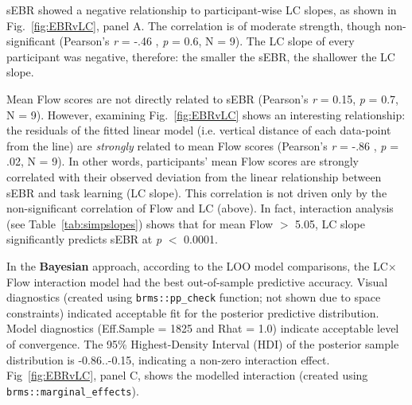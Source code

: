 \documentclass[10pt,letterpaper,floatsintext]{article}
\begin{document}
sEBR showed a negative relationship to participant-wise LC slopes, as shown in Fig.~\ref{fig:EBRvLC}, panel A. The correlation is of moderate strength, though non-significant (Pearson's {\it r} = -.46 , {\it p} = 0.6, N = 9). %
The LC slope of every participant was negative, therefore: the smaller the sEBR, the shallower the LC slope.%


Mean Flow scores are not directly related to sEBR (Pearson's {\it r} = 0.15, {\it p} = 0.7, N = 9). %
However, examining Fig.~\ref{fig:EBRvLC} shows an interesting relationship: the residuals of the fitted linear model (i.e. vertical distance of each data-point from the line) are {\it strongly} related to mean Flow scores (Pearson's {\it r} = -.86 , {\it p} = .02, N = 9). %
In other words, participants' mean Flow scores are strongly correlated with their observed deviation from the linear relationship between sEBR and task learning (LC slope). This correlation is not driven only by the non-significant correlation of Flow and LC (above). In fact, interaction analysis (see Table~\ref{tab:simpslopes}) shows that for mean Flow $>$ 5.05, LC slope significantly predicts sEBR at {\it p} $<$ 0.0001. %

In the \textbf{Bayesian} approach, according to the LOO model comparisons, the LC$\times$Flow interaction model had the best out-of-sample predictive accuracy. Visual diagnostics (created using \verb|brms::pp_check| function; not shown due to space constraints) indicated acceptable fit for the posterior predictive distribution. Model diagnostics (Eff.Sample = 1825 and Rhat = 1.0) indicate acceptable level of convergence. The 95\% Highest-Density Interval (HDI) of the posterior sample distribution is -0.86..-0.15, indicating a non-zero interaction effect. Fig~\ref{fig:EBRvLC}, panel C, shows the modelled interaction (created using \verb|brms::marginal_effects|).
\end{document}
